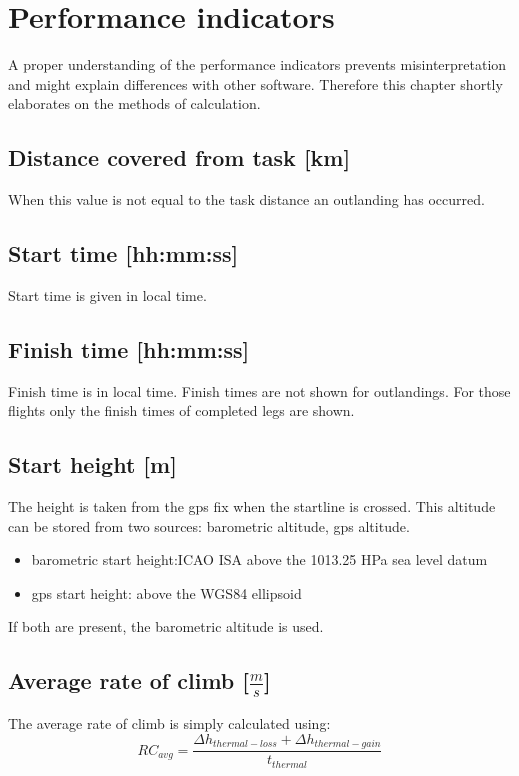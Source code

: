 \chapter{Performance indicators}
A proper understanding of the performance indicators prevents misinterpretation and might explain differences with other software. Therefore this chapter shortly elaborates on the methods of calculation.

\section{Distance covered from task [km]}
When this value is not equal to the task distance an outlanding has occurred.

\section{Start time [hh:mm:ss]}
Start time is given in local time.

\section{Finish time [hh:mm:ss]}
Finish time is in local time. Finish times are not shown for outlandings. For those flights only the finish times of completed legs are shown.

\section{Start height [m]}
The height is taken from the gps fix when the startline is crossed. This altitude can be stored from two sources: barometric altitude, gps altitude. 
\begin{itemize}
\item barometric start height:ICAO ISA above the 1013.25 HPa sea level datum
\item gps start height: above the WGS84 ellipsoid
\end{itemize}
If both are present, the barometric altitude is used.

\section{Average rate of climb [$\frac{m}{s}$]}
The average rate of climb is simply calculated using:
\begin{equation}
R{C_{avg}} = \frac{{\Delta {h_{thermal - loss}} + \Delta {h_{thermal - gain}}}}{{{t_{thermal}}}}
\end{equation}

